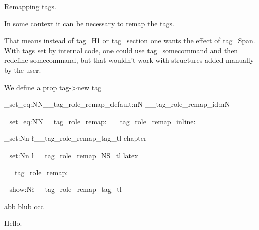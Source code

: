 \documentclass{article}
\begin{document}
Remapping tags. 

In some context it can be necessary to remap the tags. 

That means instead of tag=H1 or tag=section one wants the effect of tag=Span.
With tags set by internal code, one could use tag=somecommand and then redefine somecommand,
but that wouldn't work with structures added manually by the user. 

We define a prop tag->new tag

\ExplSyntaxOn
% 

\cs_set_eq:NN\__tag_role_remap_default:nN \__tag_role_remap_id:nN
 
\cs_set_eq:NN\__tag_role_remap: \__tag_role_remap_inline: 

\tl_set:Nn \l__tag_role_remap_tag_tl {chapter} 

\tl_set:Nn \l__tag_role_remap_NS_tl {latex} 

\__tag_role_remap:

\tl_show:N\l__tag_role_remap_tag_tl

abb 
\tagmcend{}blub\tagmcend\tagstructend{} 
ccc 

 
\ExplSyntaxOff

 

Hello.
\end{document}
